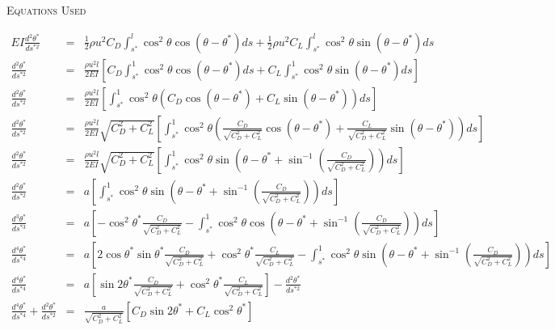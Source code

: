 \documentclass[a3paper,12pt]{report}
\begin{document}
	\begin{center}
		\Large
		\textsc{Equations Used}\\\normalsize
	\end{center}
	\vspace{-3ex}
	\underline{\hspace{9.77in}}
	\begin{eqnarray}
		EI\frac{d^2\theta^*}{ds^{*2}} &=& \frac{1}{2}\rho u^2C_D\int_{s^*}^{l} \cos^2\theta\cos(\theta - \theta^*) ds + \frac{1}	{2}\rho u^2C_L\int_{s^*}^{l} \cos^2\theta\sin(\theta - \theta^*) ds\\
		\frac{d^2\theta^*}{ds^{*2}} &=& \frac{\rho u^2l}{2EI}\left[C_D\int_{s^*}^{1} \cos^2\theta\cos(\theta - \theta^*) ds + C_L\int_{s^*}^{1} \cos^2\theta\sin(\theta - \theta^*) ds	\right]\\
		\frac{d^2\theta^*}{ds^{*2}} &=& \frac{\rho u^2l}{2EI}\left[\int_{s^*}^{1} \cos^2\theta\left(C_D\cos(\theta - \theta^*) + C_L\sin(\theta - \theta^*)\right) ds	\right]\\
		\frac{d^2\theta^*}{ds^{*2}} &=& \frac{\rho u^2l}{2EI}\sqrt{C_D^2+C_L^2}\left[\int_{s^*}^{1} \cos^2\theta\left(\frac{C_D}{\sqrt{C_D^2+C_L^2}}\cos(\theta - \theta^*) + \frac{C_L}{\sqrt{C_D^2+C_L^2}}\sin(\theta - \theta^*)\right) ds	\right]\\
		\frac{d^2\theta^*}{ds^{*2}} &=& \frac{\rho u^2l}{2EI}\sqrt{C_D^2+C_L^2}\left[\int_{s^*}^{1} \cos^2\theta\sin\left(\theta - \theta^*+\sin^{-1}\left(\frac{C_D}{\sqrt{C_D^2+C_L^2} }\right)\right) ds\right]\\
		\frac{d^2\theta^*}{ds^{*2}} &=& a\left[\int_{s^*}^{1} \cos^2\theta\sin\left(\theta - \theta^*+\sin^{-1}\left(\frac{C_D}{\sqrt{C_D^2+C_L^2} }\right)\right) ds\right]\\
		\frac{d^3\theta^*}{ds^{*3}} &=& a\left[-\cos^2\theta^*\frac{C_D}{\sqrt{C_D^2+C_L^2} }-\int_{s^*}^{1} \cos^2\theta\cos\left(\theta - \theta^*+\sin^{-1}\left(\frac{C_D}{\sqrt{C_D^2+C_L^2} }\right)\right) ds\right]\\
		\frac{d^4\theta^*}{ds^{*4}} &=& a\left[2\cos\theta^*\sin\theta^*\frac{C_D}{\sqrt{C_D^2+C_L^2}}+ \cos^2\theta^*\frac{C_L}{\sqrt{C_D^2+C_L^2}}-\int_{s^*}^{1} \cos^2\theta\sin\left(\theta - \theta^*+\sin^{-1}\left(\frac{C_D}{\sqrt{C_D^2+C_L^2} }\right)\right) ds\right]\\
		\frac{d^4\theta^*}{ds^{*4}} &=& a\left[\sin2\theta^*\frac{C_D}{\sqrt{C_D^2+C_L^2}}+ \cos^2\theta^*\frac{C_L}{\sqrt{C_D^2+C_L^2}}\right]-\frac{d^2\theta^*}{ds^{*2}}\\
		\frac{d^4\theta^*}{ds^{*4}}+\frac{d^2\theta^*}{ds^{*2}} &=& \frac{a}{\sqrt{C_D^2+C_L^2}}\left[C_D\sin2\theta^*+ C_L\cos^2\theta^*\right]\\

\end{eqnarray}
\end{document}
